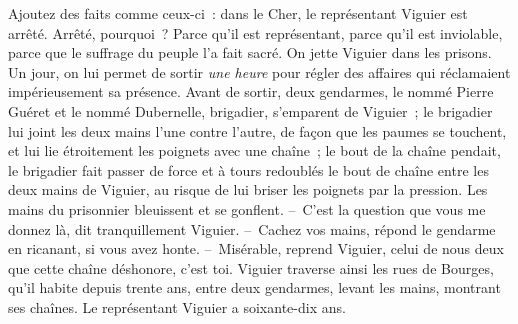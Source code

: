 \documentclass[french,twoside]{book} %
\begin{document}
Ajoutez des faits comme ceux-ci : dans le Cher, le représentant Viguier est arrêté. Arrêté, pourquoi ? Parce qu’il est représentant, parce qu’il est inviolable, parce que le suffrage du peuple l’a fait sacré. On jette Viguier dans les prisons. Un jour, on lui permet de sortir \emph{une heure} pour régler des affaires qui réclamaient impérieusement sa présence. Avant de sortir, deux gendarmes, le nommé Pierre Guéret et le nommé Dubernelle, brigadier, s’emparent de Viguier ; le brigadier lui joint les deux mains l’une contre l’autre, de façon que les paumes se touchent, et lui lie étroitement les poignets avec une chaîne ; le bout de la chaîne pendait, le brigadier fait passer de force et à tours redoublés le bout de chaîne entre les deux mains de Viguier, au risque de lui briser les poignets par la pression. Les mains du prisonnier bleuissent et se gonflent. – C’est la question que vous me donnez là, dit tranquillement Viguier. – Cachez vos mains, répond le gendarme en ricanant, si vous avez honte. – Misérable, reprend Viguier, celui de nous deux que cette chaîne déshonore, c’est toi. Viguier traverse ainsi les rues de Bourges, qu’il habite depuis trente ans, entre deux gendarmes, levant les mains, montrant ses chaînes. Le représentant Viguier a soixante-dix ans.\par
\end{document}
